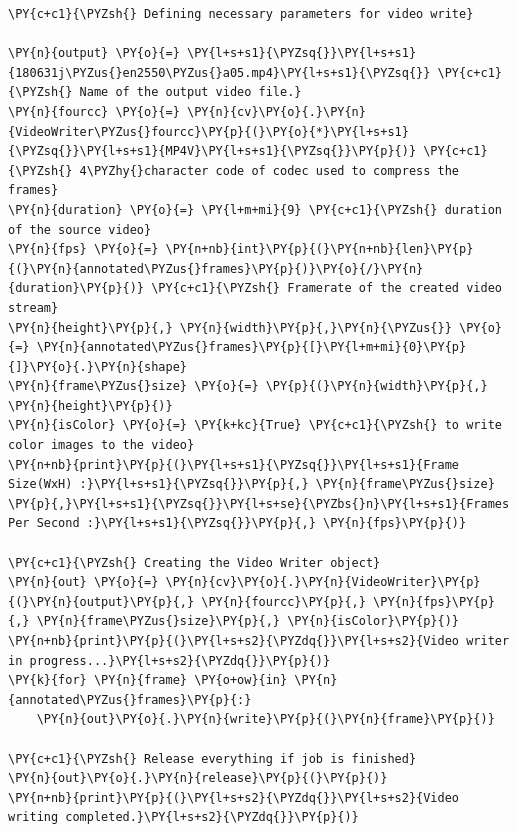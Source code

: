 \documentclass[a4paper,11pt]{article}%
\begin{document}
    \begin{tcolorbox}[breakable, size=fbox, boxrule=1pt, pad at break*=1mm,colback=cellbackground, colframe=cellborder]
\begin{Verbatim}[commandchars=\\\{\}]
\PY{c+c1}{\PYZsh{} Defining necessary parameters for video write}

\PY{n}{output} \PY{o}{=} \PY{l+s+s1}{\PYZsq{}}\PY{l+s+s1}{180631j\PYZus{}en2550\PYZus{}a05.mp4}\PY{l+s+s1}{\PYZsq{}} \PY{c+c1}{\PYZsh{} Name of the output video file.}
\PY{n}{fourcc} \PY{o}{=} \PY{n}{cv}\PY{o}{.}\PY{n}{VideoWriter\PYZus{}fourcc}\PY{p}{(}\PY{o}{*}\PY{l+s+s1}{\PYZsq{}}\PY{l+s+s1}{MP4V}\PY{l+s+s1}{\PYZsq{}}\PY{p}{)} \PY{c+c1}{\PYZsh{} 4\PYZhy{}character code of codec used to compress the frames}
\PY{n}{duration} \PY{o}{=} \PY{l+m+mi}{9} \PY{c+c1}{\PYZsh{} duration of the source video}
\PY{n}{fps} \PY{o}{=} \PY{n+nb}{int}\PY{p}{(}\PY{n+nb}{len}\PY{p}{(}\PY{n}{annotated\PYZus{}frames}\PY{p}{)}\PY{o}{/}\PY{n}{duration}\PY{p}{)} \PY{c+c1}{\PYZsh{} Framerate of the created video stream}
\PY{n}{height}\PY{p}{,} \PY{n}{width}\PY{p}{,}\PY{n}{\PYZus{}} \PY{o}{=} \PY{n}{annotated\PYZus{}frames}\PY{p}{[}\PY{l+m+mi}{0}\PY{p}{]}\PY{o}{.}\PY{n}{shape}
\PY{n}{frame\PYZus{}size} \PY{o}{=} \PY{p}{(}\PY{n}{width}\PY{p}{,} \PY{n}{height}\PY{p}{)}
\PY{n}{isColor} \PY{o}{=} \PY{k+kc}{True} \PY{c+c1}{\PYZsh{} to write color images to the video}
\PY{n+nb}{print}\PY{p}{(}\PY{l+s+s1}{\PYZsq{}}\PY{l+s+s1}{Frame Size(WxH) :}\PY{l+s+s1}{\PYZsq{}}\PY{p}{,} \PY{n}{frame\PYZus{}size} \PY{p}{,}\PY{l+s+s1}{\PYZsq{}}\PY{l+s+se}{\PYZbs{}n}\PY{l+s+s1}{Frames Per Second :}\PY{l+s+s1}{\PYZsq{}}\PY{p}{,} \PY{n}{fps}\PY{p}{)}

\PY{c+c1}{\PYZsh{} Creating the Video Writer object}
\PY{n}{out} \PY{o}{=} \PY{n}{cv}\PY{o}{.}\PY{n}{VideoWriter}\PY{p}{(}\PY{n}{output}\PY{p}{,} \PY{n}{fourcc}\PY{p}{,} \PY{n}{fps}\PY{p}{,} \PY{n}{frame\PYZus{}size}\PY{p}{,} \PY{n}{isColor}\PY{p}{)}
\PY{n+nb}{print}\PY{p}{(}\PY{l+s+s2}{\PYZdq{}}\PY{l+s+s2}{Video writer in progress...}\PY{l+s+s2}{\PYZdq{}}\PY{p}{)}
\PY{k}{for} \PY{n}{frame} \PY{o+ow}{in} \PY{n}{annotated\PYZus{}frames}\PY{p}{:}
    \PY{n}{out}\PY{o}{.}\PY{n}{write}\PY{p}{(}\PY{n}{frame}\PY{p}{)}

\PY{c+c1}{\PYZsh{} Release everything if job is finished}
\PY{n}{out}\PY{o}{.}\PY{n}{release}\PY{p}{(}\PY{p}{)}
\PY{n+nb}{print}\PY{p}{(}\PY{l+s+s2}{\PYZdq{}}\PY{l+s+s2}{Video writing completed.}\PY{l+s+s2}{\PYZdq{}}\PY{p}{)}
\end{Verbatim}
\end{tcolorbox}
\end{document}
